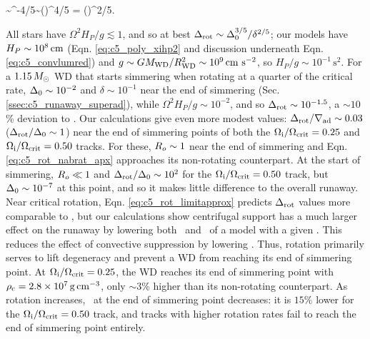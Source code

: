 \eqbegin
\dnabrot \sim \rossby^{-4/5}\dnabconvzero \sim \left(\right)^{4/5} = \left(\right)^{2/5}.
\label{eq:c5_rot_limitapprox}
\eqend


\noindent All stars have $\Omega^2 H_P/g \lesssim 1$, and so at best $\dnabrot \sim \dnabconvzero^{3/5}/\delta^{2/5}$; our models have $H_P \sim 10^8\,\mathrm{cm}$ (Eqn. \ref{eq:c5_poly_xihp2} and discussion underneath Eqn. \ref{eq:c5_convlumred}) and $g \sim GM_\mrm{WD}/R_\mrm{WD}^2 \sim 10^9\,\cmpsecsq$, so $H_P/g \sim 10^{-1}\,\mathrm{s}^2$.  For a $1.15\,\Msun$ WD that starts simmering when rotating at a quarter of the critical rate, $\dnabconvzero \sim 10^{-2}$ and $\delta \sim 10^{-1}$ near the end of simmering (Sec. \ref{ssec:c5_runaway_superad}), while $\Omega^2 H_P/g \sim 10^{-2}$, and so $\dnabrot \sim 10^{-1.5}$, a $\sim10$\% deviation to \nablaad.  Our calculations give even more modest values: $\dnabrot/\nablaad \sim 0.03$ ($\dnabrot/\dnabconvzero \sim 1$) near the end of simmering points of both the $\Ominit/\Omcrit = 0.25$ and $\Ominit/\Omcrit = 0.50$ tracks.  For these, $\rossby \sim 1$ near the end of simmering and Eqn. \ref{eq:c5_rot_nabrat_apx} approaches its non-rotating counterpart.  At the start of simmering, $\rossby \ll 1$ and $\dnabrot/\dnabconvzero \sim 10^2$ for the $\Ominit/\Omcrit = 0.50$ track, but $\dnabconvzero \sim 10^{-7}$ at this point, and so it makes little difference to the overall runaway.  Near critical rotation, Eqn. \ref{eq:c5_rot_limitapprox} predicts $\dnabrot$ values more comparable to \nablaad, but our calculations show centrifugal support has a much larger effect on the runaway by lowering both \rhoc\ and \Tc\ of a model with a given \Sc.  This reduces the effect of convective suppression by lowering \vconv.  Thus, rotation primarily serves to lift degeneracy and prevent a WD from reaching its end of simmering point.  At $\Ominit/\Omcrit = 0.25$, the WD reaches its end of simmering point with $\rhoc = 2.8\times10^7\,\gcc$, only $\sim3$\% higher than its non-rotating counterpart.  As rotation increases, \rhoc\ at the end of simmering point decreases: it is $15$\% lower for the $\Ominit/\Omcrit = 0.50$ track, and tracks with higher rotation rates fail to reach the end of simmering point entirely.

